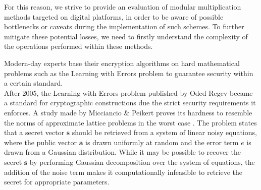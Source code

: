 \documentclass[11pt,
  titlepage=false,
  abstract=on,
]{scrreprt}
\begin{document}
For this reason, we strive to provide an evaluation of modular multiplication methods targeted on digital platforms, in order to be aware of possible bottlenecks 
or caveats during the implementation of such schemes. To further mitigate these potential losses, we need to firstly understand the complexity of the operations
performed within these methods.

Modern-day experts base their encryption algorithms on hard mathematical problems such as the Learning with Errors problem to guarantee security within a certain standard.\\
After 2005, the Learning with Errors problem published by Oded Regev \cite{regev2010learning} became a standard for cryptographic constructions due the strict security requirements it enforces.
A study made by Micciancio \& Peikert proves its hardness to resemble the norms of approximate lattice problems in the worst case \cite{micciancio2013hardness}.
The problem states that a secret vector $\textbf{s}$ should be retrieved from a system of linear noisy equations, where the public vector $\textbf{a}$ is drawn uniformly at random
and the error term $\textit{e}$ is drawn from a Gaussian distribution. While it may be possible to recover the secret $\textbf{s}$
by performing Gaussian decomposition over the system of equations, the addition of the noise term makes it computationally infeasible to retrieve the
secret for appropriate parameters.

\end{document}
